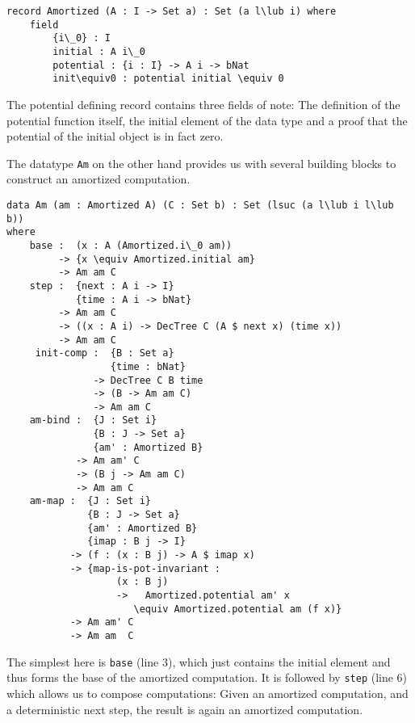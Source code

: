 \begin{lstlisting}[caption={Record defining the potential for a type A},label={lst:amortized:framework:potential},emph={Amortized,initial,potential,init}]
record Amortized (A : I -> Set a) : Set (a l\lub i) where
    field
        {i\_0} : I
        initial : A i\_0
        potential : {i : I} -> A i -> bNat
        init\equiv0 : potential initial \equiv 0
\end{lstlisting}

The potential defining record contains three fields of note: The definition of the potential function itself, the initial element of the data type and a proof that the potential of the initial object is in fact zero.

The datatype \texttt{Am} on the other hand provides us with several building blocks to construct an amortized computation.

\begin{lstlisting}[caption={Building blocks of an amortized computation},label={lst:amortized:framework:computation},emph={Am,Amortized,base,init,comp,step,bind,map,initial,DecTree}]
data Am (am : Amortized A) (C : Set b) : Set (lsuc (a l\lub i l\lub b))
where
    base :  (x : A (Amortized.i\_0 am))
         -> {x \equiv Amortized.initial am}
         -> Am am C
    step :  {next : A i -> I}
            {time : A i -> bNat}
         -> Am am C
         -> ((x : A i) -> DecTree C (A $ next x) (time x))
         -> Am am C
     init-comp :  {B : Set a}
                  {time : bNat}
               -> DecTree C B time
               -> (B -> Am am C)
               -> Am am C
    am-bind :  {J : Set i}
               {B : J -> Set a}
               {am' : Amortized B}
            -> Am am' C
            -> (B j -> Am am C)
            -> Am am C
    am-map :  {J : Set i}
              {B : J -> Set a}
              {am' : Amortized B}
              {imap : B j -> I}
           -> (f : (x : B j) -> A $ imap x)
           -> {map-is-pot-invariant :
                   (x : B j)
                   ->   Amortized.potential am' x
                      \equiv Amortized.potential am (f x)}
           -> Am am' C
           -> Am am  C
\end{lstlisting}

The simplest here is \texttt{base} (line 3), which just contains the initial element and thus forms the base of the amortized computation. It is followed by \texttt{step} (line 6) which allows us to compose computations: Given an amortized computation, and a deterministic next step, the result is again an amortized computation.

